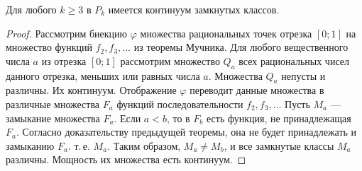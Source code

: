 \begin{corollary}
    Для любого $k \geqslant 3$ в $P_k$ имеется континуум замкнутых классов.
\end{corollary}

\begin{proof}
    Рассмотрим биекцию $\varphi$ множества рациональных точек отрезка $[0; 1]$ на множество функций $f_2, f_3, \ldots$ из теоремы Мучника. Для любого вещественного числа $a$ из отрезка $[0; 1]$ рассмотрим множество $Q_a$ всех рациональных чисел данного отрезка, меньших или равных числа $a$. Множества $Q_a$ непусты и различны. Их континуум. Отображение $\varphi$ переводит данные множества в различные множества $F_a$ функций последовательности $f_2, f_3, \ldots$ Пусть $M_a$ --- замыкание множества $F_a$. Если $a < b$, то в $F_b$ есть функция, не принадлежащая $F_a$. Согласно доказательству предыдущей теоремы, она не будет принадлежать и замыканию $F_a$. т.\,е. $M_a$. Таким образом, $M_a \ne M_b$, и все замкнутые классы $M_a$ различны. Мощность их множества есть континуум.
\end{proof}

